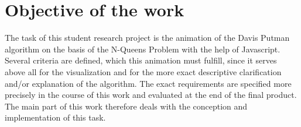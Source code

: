 \section{Objective of the work}
The task of this student research project is the animation of the Davis Putman algorithm on the basis of the N-Queens Problem with the help of Javascript. Several criteria are defined, which this animation must fulfill, since it serves above all for the visualization and for the more exact descriptive clarification and/or explanation of the algorithm. The exact requirements are specified more precisely in the course of this work and evaluated at the end of the final product. The main part of this work therefore deals with the conception and implementation of this task.
